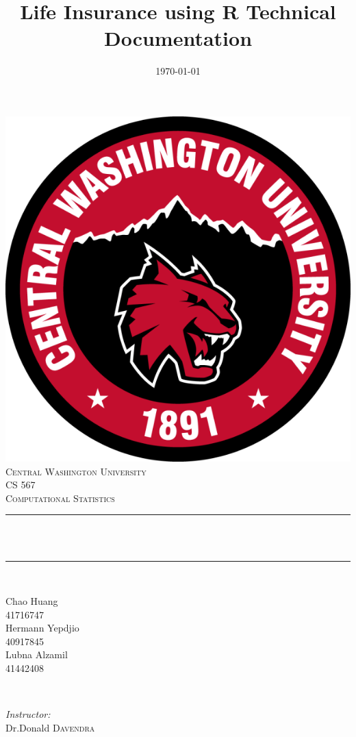 \documentclass[12pt]{article}
\title{ Life Insurance using R Technical Documentation }		%
\date{\today}											%
\makeatletter
\let\thetitle\@title
\makeatother
\begin{document}
	
	
	\begin{titlepage}
		\centering
		\vspace*{0.1 cm}
		\includegraphics[scale = 0.2]{cwu.PNG}\\[1.0 cm]
		\textsc{\LARGE Central Washington University}\\[2.0 cm]	%
		\textsc{\Large CS 567}\\[0.5 cm]	%
		\textsc{\large Computational Statistics}\\[0.5 cm]	%
		\rule{\linewidth}{0.2 mm} \\[0.4 cm]
		{ \huge \bfseries \thetitle}\\
		\rule{\linewidth}{0.2 mm} \\[1.5 cm]
		
		\begin{minipage}{0.4\textwidth}
			\begin{flushleft} \large
				Chao Huang  \\
				41716747\\
				Hermann Yepdjio\\
				40917845\\
				Lubna Alzamil\\
				41442408
			\end{flushleft}
		\end{minipage}~
		\begin{minipage}{0.4\textwidth}
			\begin{center} \large
\emph{Instructor:} \\
Dr.Donald \textsc{Davendra}					
			\end{center}
		\end{minipage}\\[1 cm]
		

\end{titlepage}
\end{document}
